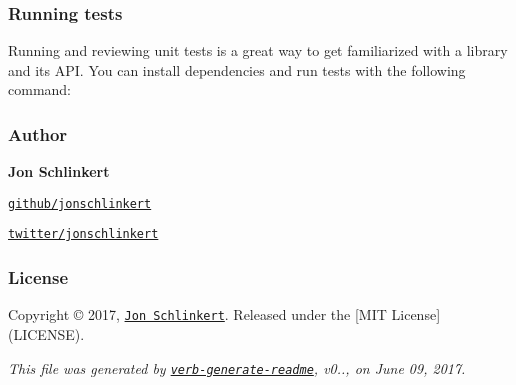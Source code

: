 \subsubsection*{Running tests}

Running and reviewing unit tests is a great way to get familiarized with a library and its A\+PI. You can install dependencies and run tests with the following command\+:




\subsubsection*{Author}

{\bfseries Jon Schlinkert}


\begin{DoxyItemize}
\item \href{https://github.com/jonschlinkert}{\tt github/jonschlinkert}
\item \href{https://twitter.com/jonschlinkert}{\tt twitter/jonschlinkert}
\end{DoxyItemize}

\subsubsection*{License}

Copyright © 2017, \href{https://github.com/jonschlinkert}{\tt Jon Schlinkert}. Released under the \mbox{[}M\+IT License\mbox{]}(L\+I\+C\+E\+N\+SE).





{\itshape This file was generated by \href{https://github.com/verbose/verb-generate-readme}{\tt verb-\/generate-\/readme}, v0.., on June 09, 2017.} 